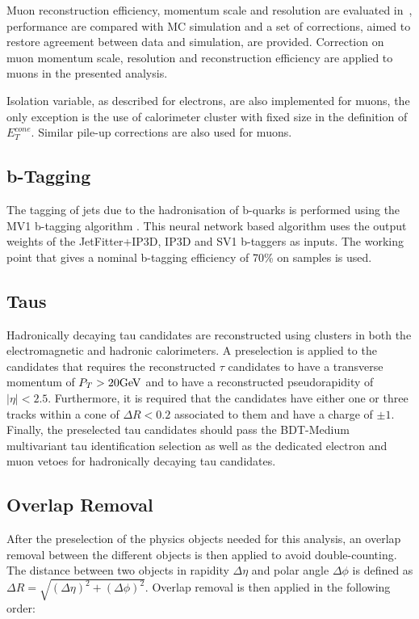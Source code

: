 Muon reconstruction efficiency, momentum scale and resolution are evaluated in~\cite{muoneffres},
performance are compared with MC simulation and a set of corrections, aimed to restore agreement
between data and simulation, are provided. Correction on muon momentum scale, resolution and reconstruction
efficiency are applied to muons in the presented analysis.

Isolation variable, as described for electrons, are also implemented for muons, the only exception 
is the use of calorimeter cluster with fixed size in the definition of $E_T^{cone}$.
Similar pile-up corrections are also used for muons.  



\subsection{b-Tagging}
\label{sec:presel:btag}

The tagging of jets due to the hadronisation of b-quarks is performed
using the MV1 b-tagging algorithm \cite{mv1}. This neural network based
algorithm uses the output weights of the JetFitter+IP3D, IP3D and
SV1 b-taggers as inputs. The working point that gives a nominal
b-tagging efficiency of 70\% on \ttbar samples is used.

\subsection{Taus}
\label{sec:presel:tau}

Hadronically decaying tau candidates are reconstructed using clusters
in both the electromagnetic and hadronic calorimeters. A preselection
is applied to the candidates that requires the reconstructed $\tau$
candidates to have a transverse momentum of $P_{T}>20 \text{GeV}$ and to have
a reconstructed pseudorapidity of $|\eta| < 2.5$. Furthermore, it is
required that the candidates have either one or three tracks within a
cone of $\Delta R < 0.2$ associated to them and have a charge of $\pm
1$. Finally, the preselected tau candidates should pass the BDT-Medium
multivariant tau identification selection as well as the dedicated
electron and muon vetoes for hadronically decaying tau candidates.


\subsection{Overlap Removal}
\label{sec:presel:olr}

After the preselection of the physics objects needed for this
analysis, an overlap removal between the different objects is then
applied to avoid double-counting.  The distance between two objects in
rapidity $\Delta\eta$ and polar angle $\Delta\phi$ is defined as
$\Delta R=\sqrt{(\Delta\eta)^2+(\Delta\phi)^2}$. Overlap removal is
then applied in the following order:

